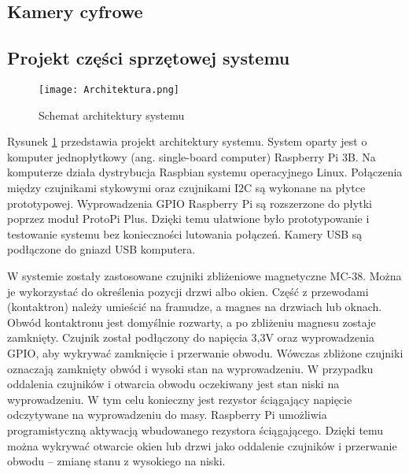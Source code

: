 \documentclass[a4paper,12pt,twoside]{article}
\begin{document}
\subsection{Kamery cyfrowe}

\subsection{Projekt części sprzętowej systemu}
\begin{figure}[h]
\texttt{[image: Architektura.png]}
\caption{Schemat architektury systemu}
\label{fig: architektura}
\end{figure}

Rysunek \ref{fig: architektura} przedstawia projekt architektury systemu. System oparty jest o komputer jednopłytkowy (ang. single-board computer) Raspberry Pi 3B. Na komputerze działa dystrybucja Raspbian systemu operacyjnego Linux. Połączenia między czujnikami stykowymi oraz czujnikami I2C są wykonane na płytce prototypowej. Wyprowadzenia GPIO Raspberry Pi są rozszerzone do płytki poprzez moduł ProtoPi Plus. Dzięki temu ułatwione było prototypowanie i testowanie systemu bez konieczności lutowania połączeń. Kamery USB są podłączone do gniazd USB komputera.

W systemie zostały zastosowane czujniki zbliżeniowe magnetyczne MC-38. Można je wykorzystać do określenia pozycji drzwi albo okien. Część z przewodami (kontaktron) należy umieścić na framudze, a magnes na drzwiach lub oknach. Obwód kontaktronu jest domyślnie rozwarty, a po zbliżeniu magnesu zostaje zamknięty. Czujnik został podłączony do napięcia 3,3V oraz wyprowadzenia GPIO, aby wykrywać zamknięcie i przerwanie obwodu. Wówczas zbliżone czujniki oznaczają zamknięty obwód i wysoki stan na wyprowadzeniu. W przypadku oddalenia czujników i otwarcia obwodu oczekiwany jest stan niski na wyprowadzeniu. W tym celu konieczny jest rezystor ściągający napięcie odczytywane na wyprowadzeniu do masy. Raspberry Pi umożliwia programistyczną aktywacją wbudowanego rezystora ściągającego. Dzięki temu można wykrywać otwarcie okien lub drzwi jako oddalenie czujników i przerwanie obwodu -- zmianę stanu z wysokiego na niski.
\end{document}
